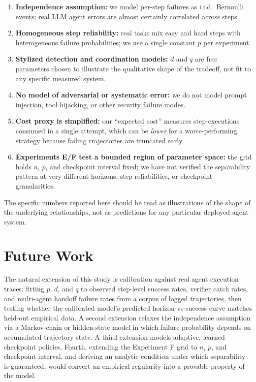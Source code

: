 \documentclass[11pt]{article}
\begin{document}
\begin{enumerate}
\item \textbf{Independence assumption:} we model per-step failures as i.i.d.\ Bernoulli events; real LLM agent errors are almost certainly correlated across steps.
\item \textbf{Homogeneous step reliability:} real tasks mix easy and hard steps with heterogeneous failure probabilities; we use a single constant $p$ per experiment.
\item \textbf{Stylized detection and coordination models:} $d$ and $q$ are free parameters chosen to illustrate the qualitative shape of the tradeoff, not fit to any specific measured system.
\item \textbf{No model of adversarial or systematic error:} we do not model prompt injection, tool hijacking, or other security failure modes.
\item \textbf{Cost proxy is simplified:} our ``expected cost'' measures step-executions consumed in a single attempt, which can be \emph{lower} for a worse-performing strategy because failing trajectories are truncated early.
\item \textbf{Experiments E/F test a bounded region of parameter space:} the grid holds $n$, $p$, and checkpoint interval fixed; we have not verified the separability pattern at very different horizons, step reliabilities, or checkpoint granularities.
\end{enumerate}

The specific numbers reported here should be read as illustrations of the shape of the underlying relationships, not as predictions for any particular deployed agent system.

\section{Future Work}
The natural extension of this study is calibration against real agent execution traces: fitting $p$, $d$, and $q$ to observed step-level success rates, verifier catch rates, and multi-agent handoff failure rates from a corpus of logged trajectories, then testing whether the calibrated model's predicted horizon-vs-success curve matches held-out empirical data. A second extension relaxes the independence assumption via a Markov-chain or hidden-state model in which failure probability depends on accumulated trajectory state. A third extension models adaptive, learned checkpoint policies. Fourth, extending the Experiment F grid to $n$, $p$, and checkpoint interval, and deriving an analytic condition under which separability is guaranteed, would convert an empirical regularity into a provable property of the model.
\end{document}

